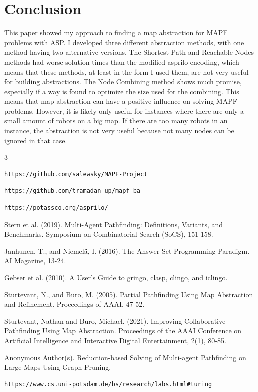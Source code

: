 \documentclass[runningheads]{llncs}
\begin{document}
\section{Conclusion}
This paper showed my approach to finding a map abstraction for MAPF problems with ASP. I developed three different abstraction methods, with one method having two alternative versions. The Shortest Path and Reachable Nodes methods had worse solution times than the modified asprilo encoding, which means that these methods, at least in the form I used them, are not very useful for building abstractions. The Node Combining method shows much promise, especially if a way is found to optimize the size used for the combining. This means that map abstraction can have a positive influence on solving MAPF problems. However, it is likely only useful for instances where there are only a small amount of robots on a big map. If there are too many robots in an instance, the abstraction is not very useful because not many nodes can be ignored in that case. 
\newpage

\begin{thebibliography} {3}
\begin{verbatim}
https://github.com/salewsky/MAPF-Project
\end{verbatim}

\begin{verbatim}
https://github.com/tramadan-up/mapf-ba
\end{verbatim}

\begin{verbatim}
https://potassco.org/asprilo/
\end{verbatim}

Stern et al. (2019). Multi-Agent Pathfinding: Definitions, Variants, and Benchmarks. Symposium on Combinatorial Search (SoCS), 151-158.

Janhunen, T., and Niemelä, I. (2016). The Answer Set Programming Paradigm. AI Magazine, 13-24.

Gebser et al. (2010). A User's Guide to gringo, clasp, clingo, and iclingo. 

Sturtevant, N., and Buro, M. (2005). Partial Pathfinding Using Map Abstraction and Refinement. Proceedings of AAAI, 47-52.

Sturtevant, Nathan and Buro, Michael. (2021). Improving Collaborative Pathfinding Using Map Abstraction. Proceedings of the AAAI Conference on Artificial Intelligence and Interactive Digital Entertainment, 2(1), 80-85.

Anonymous Author(s). Reduction-based Solving of Multi-agent Pathfinding on Large Maps Using Graph Pruning.

\begin{verbatim}
https://www.cs.uni-potsdam.de/bs/research/labs.html#turing
\end{verbatim}

\end{thebibliography}
\end{document}

